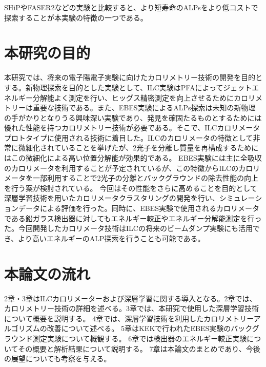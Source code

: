 SHiPやFASER2などの実験と比較すると、より短寿命のALPsをより低コストで探索することが本実験の特徴の一つである。

\section{本研究の目的}
本研究では、将来の電子陽電子実験に向けたカロリメトリー技術の開発を目的とする。新物理探索を目的とした実験として、ILC実験はPFAによってジェットエネルギー分解能よく測定を行い、ヒッグス精密測定を向上させるためにカロリメトリーは重要な技術である。また、EBES実験によるALPs探索は未知の新物理の手がかりとなりうる興味深い実験であり、発見を確固たるものとするためには優れた性能を持つカロリメトリー技術が必要である。そこで、ILCカロリメータプロトタイプに使用される技術に着目した。ILCのカロリメータの特徴として非常に微細化されていることを挙げたが、2光子を分離し質量を再構成するためにはこの微細化による高い位置分解能が効果的である。%
EBES実験には主に全吸収のカロリメータを利用することが予定されているが、この特徴からILCのカロリメータを一部利用することで2光子の分離とバックグラウンドの除去性能の向上を行う案が検討されている。
今回はその性能をさらに高めることを目的として深層学習技術を用いたカロリメータクラスタリングの開発を行い、シミュレーションデータによる評価を行った。同時に、EBES実験で使用されるカロリメータである鉛ガラス検出器に対してもエネルギー較正やエネルギー分解能測定を行った。今回開発したカロリメータ技術はILCの将来のビームダンプ実験にも活用でき、より高いエネルギーのALP探索を行うことも可能である。


\section{本論文の流れ}
2章・3章はILCカロリメーターおよび深層学習に関する導入となる。2章では、カロリメトリー技術の詳細を述べる。3章では、本研究で使用した深層学習技術について概要を説明する。
4章では、深層学習技術を利用したカロリメトリーアルゴリズムの改善について述べる。
5章はKEKで行われたEBES実験のバックグラウンド測定実験について概観する。
6章では検出器のエネルギー較正実験についてその概要と解析結果について説明する。
7章は本論文のまとめであり、今後の展望についても考察を与える。
